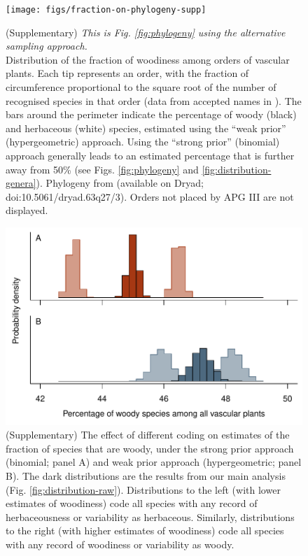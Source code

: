 \documentclass[a4paper,12pt]{article}
\begin{document}
\begin{figure}[p]
  \centering
  \texttt{[image: figs/fraction-on-phylogeny-supp]}

  \caption{(Supplementary)
    \textit{This is Fig. \ref{fig:phylogeny} using the alternative
      sampling approach.}\\
    Distribution of the fraction of woodiness among orders of vascular
    plants.  Each tip represents an order, with the fraction of
    circumference proportional to the square root of the number of
    recognised species in that order (data from accepted names in
    \citet{ThePlantList}).  The bars around the perimeter indicate the
    percentage of woody (black) and herbaceous (white) species,
    estimated using the ``weak prior'' (hypergeometric) approach.
    Using the ``strong prior'' (binomial) approach generally leads to
    an estimated percentage that is further away from 50\% (see
    Figs. \ref{fig:phylogeny} and \ref{fig:distribution-genera}).
    Phylogeny from \citet{Zanne} (available on Dryad; 
    doi:10.5061/dryad.63q27/3). Orders not placed by APG III
    \citep{APG3} are not displayed.}
  \label{fig:phylogeny-supp}
\end{figure}

\begin{figure}[p]
  \centering
  \includegraphics{figs/distribution-raw-errors}
  \caption{(Supplementary) The effect of different coding on estimates
    of the fraction of species that are woody, under the strong prior
    approach (binomial; panel A) and weak prior approach
    (hypergeometric; panel B).  The dark distributions are the results
    from our main analysis (Fig. \ref{fig:distribution-raw}).
    Distributions to the left (with lower estimates of woodiness) code
    all species with any record of herbaceousness or variability as
    herbaceous.  Similarly, distributions to the right (with higher
    estimates of woodiness) code all species with any record of
    woodiness or variability as woody.}
  \label{fig:distribution-raw-errors}
\end{figure}
    
\end{document}
